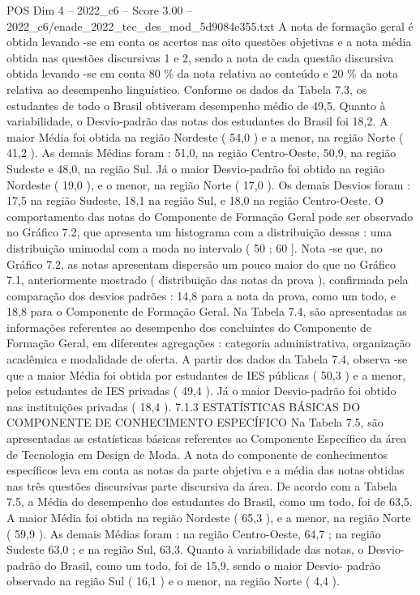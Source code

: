\begin{textsample}{POS Dim 4 – 2022\_c6 – Score 3.00 – 2022\_c6/enade\_2022\_tec\_des\_mod\_5d9084e355.txt}
A nota de formação geral é obtida levando -se em conta os acertos nas oito questões objetivas e a nota média obtida nas questões discursivas 1 e 2, sendo a nota de cada questão discursiva obtida levando -se em conta 80 \% da nota relativa ao conteúdo e 20 \% da nota relativa ao desempenho linguístico.
Conforme os dados da Tabela 7.3, os estudantes de todo o Brasil obtiveram desempenho médio de 49,5.
Quanto à variabilidade, o Desvio-padrão das notas dos estudantes do Brasil foi 18,2.
A maior Média foi obtida na região Nordeste ( 54,0 ) e a menor, na região Norte ( 41,2 ).
As demais Médias foram : 51,0, na região Centro-Oeste, 50,9, na região Sudeste e 48,0, na região Sul.
Já o maior Desvio-padrão foi obtido na região Nordeste ( 19,0 ), e o menor, na região Norte ( 17,0 ).
Os demais Desvios foram : 17,5 na região Sudeste, 18,1 na região Sul, e 18,0 na região Centro-Oeste.
O comportamento das notas do Componente de Formação Geral pode ser observado no Gráfico 7.2, que apresenta um histograma com a distribuição dessas : uma distribuição unimodal com a moda no intervalo ( 50 ; 60 ].
Nota -se que, no Gráfico 7.2, as notas apresentam dispersão um pouco maior do que no Gráfico 7.1, anteriormente mostrado ( distribuição das notas da prova ), confirmada pela comparação dos desvios padrões : 14,8 para a nota da prova, como um todo, e 18,8 para o Componente de Formação Geral.
Na Tabela 7.4, são apresentadas as informações referentes ao desempenho dos concluintes do Componente de Formação Geral, em diferentes agregações : categoria administrativa, organização acadêmica e modalidade de oferta.
A partir dos dados da Tabela 7.4, observa -se que a maior Média foi obtida por estudantes de IES públicas ( 50,3 ) e a menor, pelos estudantes de IES privadas ( 49,4 ).
Já o maior Desvio-padrão foi obtido nas instituições privadas ( 18,4 ). 7.1.3 ESTATÍSTICAS BÁSICAS DO COMPONENTE DE CONHECIMENTO ESPECÍFICO Na Tabela 7.5, são apresentadas as estatísticas básicas referentes ao Componente Específico da área de Tecnologia em Design de Moda.
A nota do componente de conhecimentos específicos leva em conta as notas da parte objetiva e a média das notas obtidas nas três questões discursivas parte discursiva da área.
De acordo com a Tabela 7.5, a Média do desempenho dos estudantes do Brasil, como um todo, foi de 63,5.
A maior Média foi obtida na região Nordeste ( 65,3 ), e a menor, na região Norte ( 59,9 ).
As demais Médias foram : na região Centro-Oeste, 64,7 ; na região Sudeste 63,0 ; e na região Sul, 63,3.
Quanto à variabilidade das notas, o Desvio-padrão do Brasil, como um todo, foi de 15,9, sendo o maior Desvio- padrão observado na região Sul ( 16,1 ) e o menor, na região Norte ( 4,4 ).

\end{textsample}
